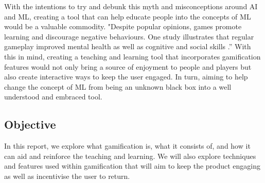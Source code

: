 		With the intentions to try and debunk this myth and misconceptions around \ac{AI} and \ac{ML}, creating a tool that can help educate people into the concepts of \ac{ML} would be a valuable commodity. "Despite popular opinions, games promote learning and discourage negative behaviours. One study illustrates that regular gameplay improved mental health as well as cognitive and social skills \cite{classcraft}.” With this in mind, creating a teaching and learning tool that incorporates gamification features would not only bring a source of enjoyment to people and players but also create interactive ways to keep the user engaged. In turn, aiming to help change the concept of \ac{ML} from being an unknown black box into a well understood and embraced tool.
	
	\subsection{Objective}
		\label{sec:intro_objective} 
		
		In this report, we explore what gamification is, what it consists of, and how it can aid and reinforce the teaching and learning. We will also explore techniques and features used within gamification that will aim to keep the product engaging as well as incentivise the user to return.
		
%		
	
		
